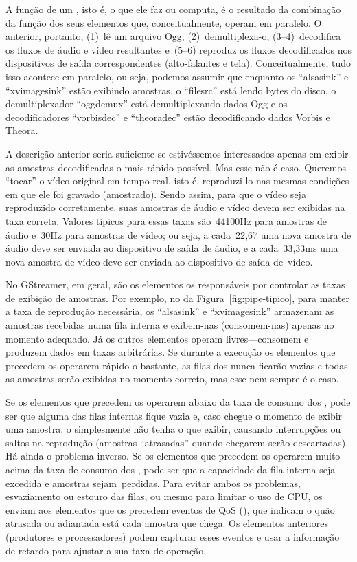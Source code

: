 \documentclass{SBCbookchapter}
\begin{document}
A função de um , isto é, o que ele faz ou computa, é o
resultado da combinação da função dos seus elementos que, conceitualmente,
operam em paralelo.  O  anterior, portanto, (1)~lê um arquivo
Ogg, (2)~demultiplexa-o, (3--4)~decodifica os fluxos de áudio e vídeo
resultantes e~(5--6) reproduz os fluxos decodificados nos dispositivos de
saída correspondentes (alto-falantes e tela).  Conceitualmente, tudo isso
acontece em paralelo, ou seja, podemos assumir que enquanto os 
``alsasink'' e ``xvimagesink'' estão exibindo amostras, o 
``filesrc'' está lendo bytes do disco, o demultiplexador ``oggdemux'' está
demultiplexando dados Ogg e os decodificadores ``vorbisdec'' e ``theoradec''
estão decodificando dados Vorbis e Theora.

A descrição anterior seria suficiente se estivéssemos interessados apenas em
exibir as amostras decodificadas o mais rápido possível.  Mas esse não é
caso.  Queremos ``tocar'' o vídeo original em tempo real, isto é,
reproduzi-lo nas mesmas condições em que ele foi gravado (amostrado).  Sendo
assim, para que o vídeo seja reproduzido corretamente, suas amostras de
áudio e vídeo devem ser exibidas na taxa correta.  Valores típicos para
essas taxas são~44100Hz para amostras de áudio e~30Hz para amostras de
vídeo; ou seja, a cada~22{,}67 uma nova amostra de áudio deve ser
enviada ao dispositivo de saída de áudio, e a cada~33{,}33ms uma nova
amostra de vídeo deve ser enviada ao dispositivo de saída de~vídeo.

No GStreamer, em geral, são os elementos  os responsáveis por
controlar as taxas de exibição de amostras.  Por exemplo, no 
da Figura~\ref{fig:pipe-tipico}, para manter a taxa de reprodução
necessária, os  ``alsasink'' e ``xvimagesink'' armazenam as
amostras recebidas numa fila interna e exibem-nas (consomem-nas) apenas no
momento adequado.  Já os outros elementos operam livres---consomem e
produzem dados em taxas arbitrárias.  Se durante a execução os elementos que
precedem os  operarem rápido o bastante, as filas dos 
nunca ficarão vazias e todas as amostras serão exibidas no momento correto,
mas esse nem sempre é o caso.

Se os elementos que precedem os  operarem abaixo da taxa de
consumo dos , pode ser que alguma das filas internas fique vazia
e, caso chegue o momento de exibir uma amostra, o  simplesmente não
tenha o que exibir, causando interrupções ou saltos na reprodução (amostras
``atrasadas'' quando chegarem serão descartadas).  Há ainda o problema
inverso.  Se os elementos que precedem os  operarem muito acima da
taxa de consumo dos , pode ser que a capacidade da fila interna
seja excedida e amostras sejam~perdidas.  Para evitar ambos os problemas,
esvaziamento ou estouro das filas, ou mesmo para limitar o uso de CPU, os
 enviam aos elementos que os precedem eventos de QoS (), que indicam o quão atrasada ou adiantada está cada amostra
que chega.  Os elementos anteriores (produtores e processadores) podem
capturar esses eventos e usar a informação de retardo para ajustar a sua
taxa de operação.
\end{document}
